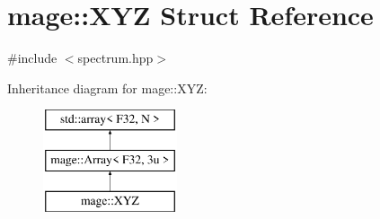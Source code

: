 \hypertarget{structmage_1_1_x_y_z}{}\section{mage\+:\+:X\+YZ Struct Reference}
\label{structmage_1_1_x_y_z}


{\ttfamily \#include $<$spectrum.\+hpp$>$}

Inheritance diagram for mage\+:\+:X\+YZ\+:\begin{figure}[H]
\begin{center}
\leavevmode
\includegraphics[height=3.000000cm]{structmage_1_1_x_y_z}
\end{center}
\end{figure}
